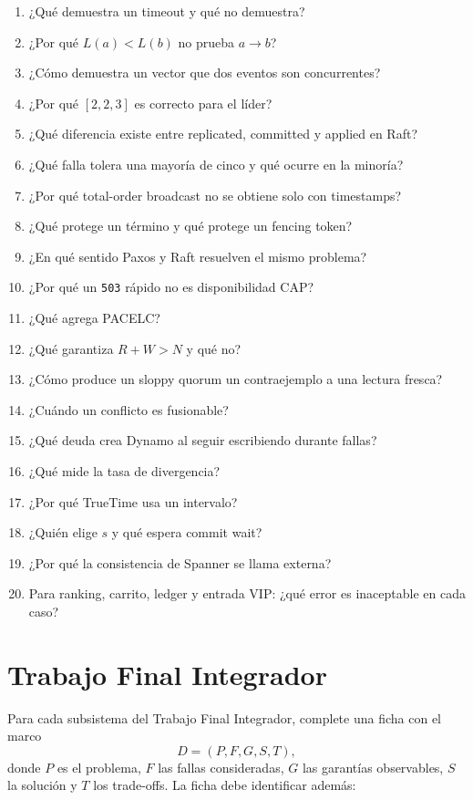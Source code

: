 \documentclass[variant=apuntes,cover=institutional,mode=screen]{ua-engineering-v6-article}
\begin{document}
\begin{enumerate}
\item ¿Qué demuestra un timeout y qué no demuestra?
\item ¿Por qué \(L(a)<L(b)\) no prueba \(a\rightarrow b\)?
\item ¿Cómo demuestra un vector que dos eventos son concurrentes?
\item ¿Por qué \([2,2,3]\) es correcto para el líder?
\item ¿Qué diferencia existe entre replicated, committed y applied en Raft?
\item ¿Qué falla tolera una mayoría de cinco y qué ocurre en la minoría?
\item ¿Por qué total-order broadcast no se obtiene solo con timestamps?
\item ¿Qué protege un término y qué protege un fencing token?
\item ¿En qué sentido Paxos y Raft resuelven el mismo problema?
\item ¿Por qué un \texttt{503} rápido no es disponibilidad CAP?
\item ¿Qué agrega PACELC?
\item ¿Qué garantiza \(R+W>N\) y qué no?
\item ¿Cómo produce un sloppy quorum un contraejemplo a una lectura fresca?
\item ¿Cuándo un conflicto es fusionable?
\item ¿Qué deuda crea Dynamo al seguir escribiendo durante fallas?
\item ¿Qué mide la tasa de divergencia?
\item ¿Por qué TrueTime usa un intervalo?
\item ¿Quién elige \(s\) y qué espera commit wait?
\item ¿Por qué la consistencia de Spanner se llama externa?
\item Para ranking, carrito, ledger y entrada VIP: ¿qué error es inaceptable en cada caso?
\end{enumerate}

\section{Trabajo Final Integrador}

Para cada subsistema del Trabajo Final Integrador, complete una ficha con el marco
\[
D=(P,F,G,S,T),
\]
donde $P$ es el problema, $F$ las fallas consideradas, $G$ las garantías observables, $S$ la solución y $T$ los trade-offs. La ficha debe identificar además:
\end{document}
